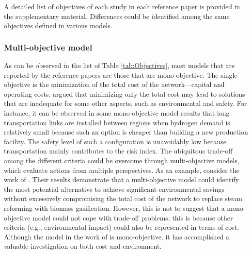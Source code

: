 \documentclass[11pt,3p]{elsarticle}
\begin{document}
A detailed list of objectives of each study in each reference paper is provided in the supplementary material. Differences could be identified among the same objectives defined in various models.

\subsubsection{Multi-objective model}

As can be observed in the list of Table \ref{tab:Objectives}, most models that are reported by the reference papers are those that are mono-objective. The single objective is the minimization of the total cost of the network---capital and operating costs. \citet{dagdougui2012models} argued that minimizing only the total cost may lead to solutions that are inadequate for some other aspects, such as environmental and safety. For instance, it can be observed in some mono-objective model results \citep{almansoori2009design,almansoori2012design} that long transportation links are installed between regions when hydrogen demand is relatively small because such an option is cheaper than building a new production facility. The safety level of such a configuration is unavoidably low because transportation mainly contributes to the risk index. The ubiquitous trade-off among the different criteria could be overcome through multi-objective models, which evaluate actions from multiple perspectives. As an example, consider the work of \citet{guillen2010bi}. Their results demonstrate that a multi-objective model could identify the most potential alternative to achieve significant environmental savings without excessively compromising the total cost of the network to replace steam reforming with biomass gasification. However, this is not to suggest that a mono-objective model could not cope with trade-off problems; this is because other criteria (e.g., environmental impact) could also be represented in terms of cost. Although the model in the work of \citet{almansoori2016design} is mono-objective, it has accomplished a valuable investigation on both cost and environment.
\end{document}
